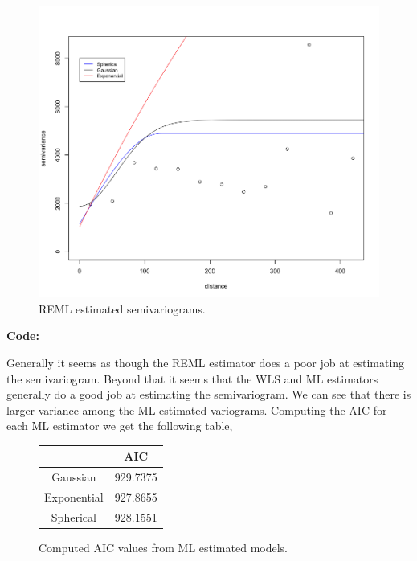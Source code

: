 \documentclass[12pt]{article}
\makeatletter
\theoremstyle{homework}
\newenvironment{exercise}[1]
{\def\@currentlabel{#1}\exercisecore}
{\endexercisecore}
\makeatother
\begin{document}
\begin{exercise}{2}
\begin{figure}[H]
\begin{center}
  \end{center}
\end{figure}
\begin{figure}[H]
  \begin{center}
    \caption{REML estimated semivariograms.}
  \includegraphics[width = \textwidth]{Rplot06.png}
  \end{center}
\end{figure}

\textbf{Code:}
\begin{center}

\end{center}


Generally it seems as though the REML estimator does a poor job at estimating the semivariogram. Beyond that it 
seems that the WLS and ML estimators generally do a good job at estimating the semivariogram. We can see that there is 
larger variance among the ML estimated variograms. Computing the AIC for each ML estimator we get the following table, 


\begin{figure}[H]
  \begin{center}
    \caption{Computed AIC values from ML estimated models.}
  \begin{tabular}{|c||c|}
    \hline
                 & AIC \\
    \hline 
    \hline
    Gaussian    & 929.7375 \\
    Exponential & 927.8655 \\
    Spherical   & 928.1551 \\
    \hline
   \end{tabular}
  \end{center}
\end{figure}


\end{exercise}
\end{document}
